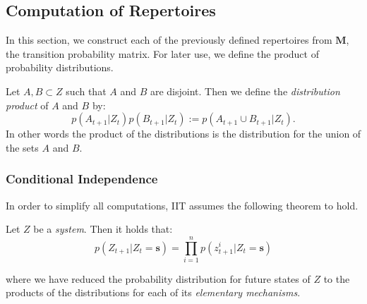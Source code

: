 \subsection{Computation of Repertoires}
\label{sec:cost}
In this section, we construct each of the previously defined repertoires from $\mathbf{M}$, the transition probability matrix. For later use, we define the product of probability distributions.



\begin{definition}
	\label{def:dist_prod}
	Let $A, B \subset Z$ such that $A$ and $B$ are disjoint. Then we define the \textit{distribution product} of $A$ and $B$ by:
	\[p(A_{t+1}|Z_t)p(B_{t+1}|Z_t):=p(A_{t+1} \cup B_{t+1}|Z_t).\]
	In other words the product of the distributions is the distribution for the union of the sets $A$ and $B$.
\end{definition} 

\subsubsection{Conditional Independence}
\label{sec:conditional_independence}
In order to simplify all computations, IIT \cite{oizumi2014phenomenology} assumes the following theorem to hold.

\begin{assumption}
	\label{asmp:cond_independence}
	Let $Z$ be a \textit{system}. Then it holds that:
	\begin{equation}
	\label{eq:cond_independence}
	p(Z_{t+1}|Z_t = \mathbf{s}) = \prod \limits_{i=1}^{n} p(z^i_{t+1}|Z_t=\mathbf{s})
	\end{equation}
	
	where we have reduced the probability distribution for future states of $Z$ to the products of the distributions for each of its \textit{elementary mechanisms}. 
\end{assumption}

